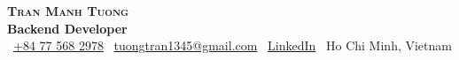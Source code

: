 \documentclass[letterpaper,11pt]{article}
\begin{document}
\begin{center}
    {\Huge\scshape\textbf{Tran Manh Tuong}} \\ \vspace{5pt}
    {\small\color{accent}\textbf{Backend Developer}} \\ \vspace{5pt}
    \small
    \faPhone\ \href{tel:+84775682978}{+84 77 568 2978}
    \quad\textbar\quad
    \faEnvelope\ \href{mailto:tuongtran1345@gmail.com}{tuongtran1345@gmail.com}
    \quad\textbar\quad
    \faLinkedin\ \href{https://linkedin.com/in/tuong-tm}{LinkedIn}
    \quad\textbar\quad
    \faMapMarker*\ Ho Chi Minh, Vietnam
\end{center}



\end{document}
